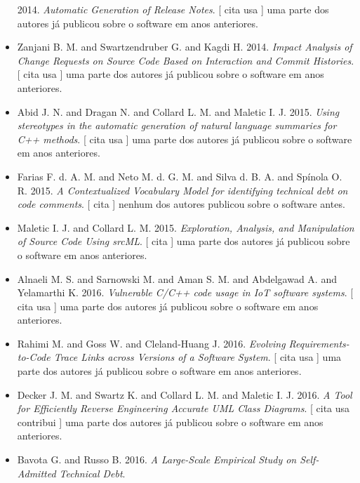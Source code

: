 \begin{itemize}
      2014.
        \textit{ Automatic Generation of Release Notes}.
      [
          cita
          usa
      ]
uma parte dos autores já publicou sobre o software em anos anteriores.
\item Zanjani B. M. and Swartzendruber G. and Kagdi H.
      2014.
        \textit{ Impact Analysis of Change Requests on Source Code Based on Interaction and Commit Histories}.
      [
          cita
          usa
      ]
uma parte dos autores já publicou sobre o software em anos anteriores.
\item Abid J. N. and Dragan N. and Collard L. M. and Maletic I. J.
      2015.
        \textit{ Using stereotypes in the automatic generation of natural language summaries for C++ methods}.
      [
          cita
          usa
      ]
uma parte dos autores já publicou sobre o software em anos anteriores.
\item Farias F. d. A. M. and Neto M. d. G. M. and Silva d. B. A. and Spínola O. R.
      2015.
        \textit{ A Contextualized Vocabulary Model for identifying technical debt on code comments}.
      [
          cita
      ]
nenhum dos autores publicou sobre o software antes.
\item Maletic I. J. and Collard L. M.
      2015.
        \textit{ Exploration, Analysis, and Manipulation of Source Code Using srcML}.
      [
          cita
      ]
uma parte dos autores já publicou sobre o software em anos anteriores.
\item Alnaeli M. S. and Sarnowski M. and Aman S. M. and Abdelgawad A. and Yelamarthi K.
      2016.
        \textit{ Vulnerable C/C++ code usage in IoT software systems}.
      [
          cita
          usa
      ]
uma parte dos autores já publicou sobre o software em anos anteriores.
\item Rahimi M. and Goss W. and Cleland-Huang J.
      2016.
        \textit{ Evolving Requirements-to-Code Trace Links across Versions of a Software System}.
      [
          cita
          usa
      ]
uma parte dos autores já publicou sobre o software em anos anteriores.
\item Decker J. M. and Swartz K. and Collard L. M. and Maletic I. J.
      2016.
        \textit{ A Tool for Efficiently Reverse Engineering Accurate UML Class Diagrams}.
      [
          cita
          usa
          contribui
      ]
uma parte dos autores já publicou sobre o software em anos anteriores.
\item Bavota G. and Russo B.
      2016.
        \textit{ A Large-Scale Empirical Study on Self-Admitted Technical Debt}.

\end{itemize}
